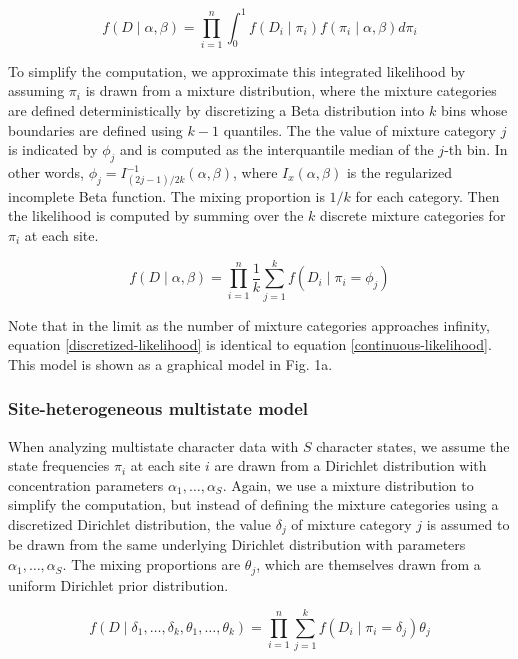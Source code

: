 \documentclass[]{article}
\begin{document}
\begin{equation} \label{continuous-likelihood}
f(D\mid \alpha,\beta) = \prod_{i=1}^n\int_0^1 f(D_i \mid \pi_i)f(\pi_i \mid \alpha,\beta)d\pi_i
\end{equation}

To simplify the computation, we approximate this integrated likelihood by assuming $\pi_i$ is drawn from a mixture distribution, where the mixture categories are defined deterministically by discretizing a Beta distribution into $k$ bins whose boundaries are defined using $k-1$ quantiles.
The the value of mixture category $j$ is indicated by $\phi_j$ and is computed as the interquantile median of the $j$-th bin.
In other words, $\phi_j = I^{-1}_{(2j-1)/2k}(\alpha,\beta)$, where $I_x(\alpha,\beta)$ is the regularized incomplete Beta function.
The mixing proportion is $1/k$ for each category.
Then the likelihood is computed by summing over the $k$ discrete mixture categories for $\pi_i$ at each site.

\begin{equation} \label{discretized-likelihood}
f(D\mid \alpha,\beta) = \prod_{i=1}^n\frac{1}{k}\sum_{j=1}^k f(D_i \mid \pi_i = \phi_j)
\end{equation}

Note that in the limit as the number of mixture categories approaches infinity, equation \ref{discretized-likelihood} is identical to equation \ref{continuous-likelihood}.
This model is shown as a graphical model in Fig. 1a.

\subsubsection{Site-heterogeneous multistate model}

When analyzing multistate character data with $S$ character states, we assume the state frequencies $\pi_i$ at each site $i$ are drawn from a Dirichlet distribution with concentration parameters $\alpha_1,\ldots,\alpha_S$.
Again, we use a mixture distribution to simplify the computation, but instead of defining the mixture categories using a discretized Dirichlet distribution, the value $\delta_j$ of mixture category $j$ is assumed to be drawn from the same underlying Dirichlet distribution with parameters $\alpha_1,\ldots,\alpha_S$.
The mixing proportions are $\theta_j$, which are themselves drawn from a uniform Dirichlet prior distribution.

$$f(D\mid \delta_1,\ldots,\delta_k,\theta_1,\ldots,\theta_k) = \prod_{i=1}^n \sum_{j=1}^k  f(D_i \mid \pi_i = \delta_j)\theta_j$$
\end{document}
